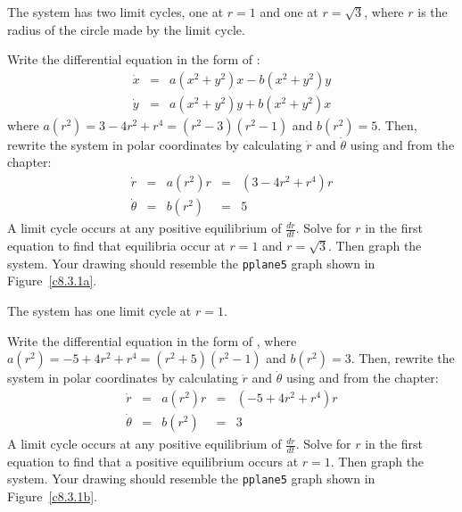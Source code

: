 \ans The system has two limit cycles, one at $r = 1$ and one at $r =
\sqrt{3}$, where $r$ is the radius of the circle made by the limit cycle.

\soln Write the differential equation in the form of :
\[ \begin{array}{rcl}
\dot{x} & = & a(x^2 + y^2)x - b(x^2 + y^2)y \\
\dot{y} & = & a(x^2 + y^2)y + b(x^2 + y^2)x \end{array}
\]
where $a(r^2) = 3 - 4r^2 + r^4=(r^2-3)(r^2-1)$ and $b(r^2) = 5$.  Then,
rewrite the system in polar coordinates by calculating $\dot{r}$ and
$\dot{\theta}$ using  and  from the
chapter:
\[ \begin{array}{rcccl}
\dot{r} & = & a(r^2)r & = & (3 - 4r^2 + r^4)r \\
\dot{\theta} & = & b(r^2) & = & 5 \end{array}
\]
A limit cycle occurs at any positive equilibrium of $\frac{dr}{dt}$.
Solve for $r$ in the first equation to find that equilibria occur
at $r = 1$ and $r = \sqrt{3}$.  Then graph the system.  Your drawing
should resemble the {\tt pplane5} graph shown in Figure~\ref{c8.3.1a}.

\begin{figure}[htb]
                       \centerline{%
                       }
\end{figure}


\ans The system has one limit cycle at $r = 1$.

\soln Write the differential equation in the form of ,
where $a(r^2) = -5 + 4r^2 + r^4=(r^2+5)(r^2-1)$ and $b(r^2) = 3$.  Then,
rewrite the system in polar coordinates by calculating $\dot{r}$ and
$\dot{\theta}$ using  and  from the
chapter:
\[ 
\begin{array}{rcccl}
\dot{r} & = & a(r^2)r & = & (-5 + 4r^2 + r^4)r \\
\dot{\theta} & = & b(r^2) & = & 3 \end{array}
\]
A limit cycle occurs at any positive equilibrium of $\frac{dr}{dt}$.
Solve for $r$ in the first equation to find that a positive equilibrium 
occurs at $r = 1$.  Then graph the system.  Your drawing should resemble the 
{\tt pplane5} graph shown in Figure~\ref{c8.3.1b}.

\begin{figure}[htb]
                       \centerline{%
                       }
\end{figure}


